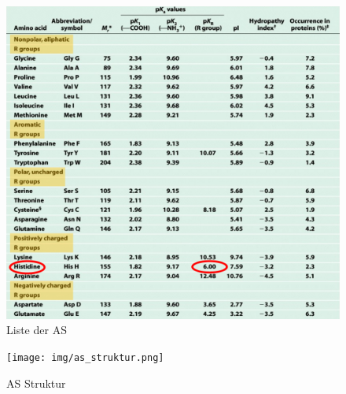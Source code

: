 \documentclass[a4paper,twocolumn,usegeometry,english,fontsize=6,DIV=16]{scrartcl}
\begin{document}
\begin{figure}
	\centering
	\includegraphics[width=\linewidth]{img/as_liste.png}
	\caption{Liste der AS}
\end{figure}

\begin{figure}
	\centering
	\texttt{[image: img/as\_struktur.png]}
	\caption{AS Struktur}
\end{figure}
\end{document}
